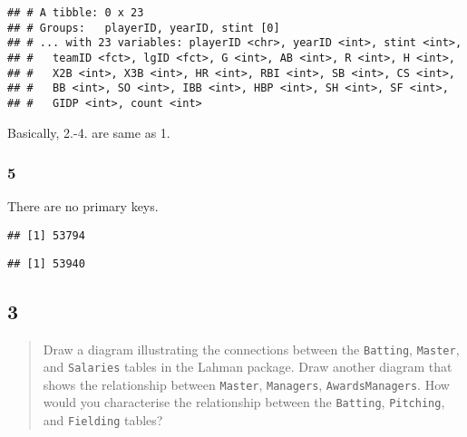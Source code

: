 \documentclass[]{ltjsarticle}
\newenvironment{Shaded}{\begin{snugshade}}{\end{snugshade}}
\newcommand{\KeywordTok}[1]{\textcolor[rgb]{0.13,0.29,0.53}{\textbf{#1}}}
\newcommand{\NormalTok}[1]{#1}
\newcommand{\OperatorTok}[1]{\textcolor[rgb]{0.81,0.36,0.00}{\textbf{#1}}}
\newcommand{\StringTok}[1]{\textcolor[rgb]{0.31,0.60,0.02}{#1}}
\begin{document}
\begin{verbatim}
## # A tibble: 0 x 23
## # Groups:   playerID, yearID, stint [0]
## # ... with 23 variables: playerID <chr>, yearID <int>, stint <int>,
## #   teamID <fct>, lgID <fct>, G <int>, AB <int>, R <int>, H <int>,
## #   X2B <int>, X3B <int>, HR <int>, RBI <int>, SB <int>, CS <int>,
## #   BB <int>, SO <int>, IBB <int>, HBP <int>, SH <int>, SF <int>,
## #   GIDP <int>, count <int>
\end{verbatim}

Basically, 2.-4. are same as 1.

\hypertarget{section-9}{%
\subsubsection{5}\label{section-9}}

There are no primary keys.

\begin{Shaded}
\end{Shaded}

\begin{verbatim}
## [1] 53794
\end{verbatim}

\begin{Shaded}
\end{Shaded}

\begin{verbatim}
## [1] 53940
\end{verbatim}

\hypertarget{section-10}{%
\subsection{3}\label{section-10}}

\begin{quote}
Draw a diagram illustrating the connections between the
\texttt{Batting}, \texttt{Master}, and \texttt{Salaries} tables in the
Lahman package. Draw another diagram that shows the relationship between
\texttt{Master}, \texttt{Managers}, \texttt{AwardsManagers}. How would
you characterise the relationship between the \texttt{Batting},
\texttt{Pitching}, and \texttt{Fielding} tables?
\end{quote}
\end{document}
